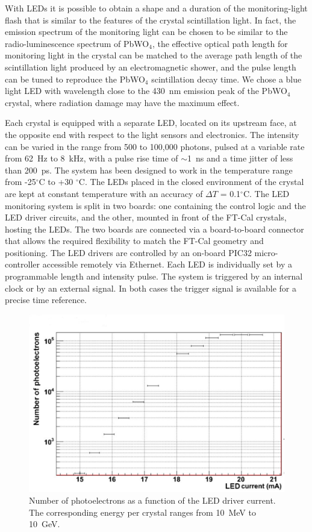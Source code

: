 With LEDs it is possible to obtain a shape and a duration of the monitoring-light flash that is similar to the features
of the crystal scintillation light. In fact, the emission spectrum of the monitoring light can be chosen to be similar to
the radio-luminescence spectrum of PbWO$_4$, the effective optical path length for monitoring light in the crystal
can be matched to the average path length of the scintillation light produced by an electromagnetic shower, and the
pulse length can be tuned to reproduce the PbWO$_4$ scintillation decay time. We chose a blue light LED with
wavelength close to the 430~nm emission peak of the PbWO$_4$ crystal, where radiation damage may have the
maximum effect.

Each crystal is equipped with a separate LED, located on its upstream face, at the opposite end with respect to the
light sensors and electronics. The intensity can be varied in the range from 500 to 100,000 photons, pulsed at a
variable rate from 62~Hz to 8~kHz, with a pulse rise time of $\sim$1~ns and a time jitter of less than 200~ps. The
system has been designed to work in the temperature range from -25$^\circ$C to +30 $^\circ$C. The LEDs placed in
the closed environment of the crystal are kept at constant temperature with an accuracy of $\Delta T$ = 0.1$^\circ$C.
The LED monitoring system is split in two boards: one containing the control logic and the LED driver circuits, and the
other, mounted in front of the FT-Cal crystals, hosting the LEDs. The two boards are connected via a board-to-board
connector that allows the required flexibility to match the FT-Cal geometry and positioning. The LED drivers are
controlled by an on-board PIC32 micro-controller accessible remotely via Ethernet. Each LED is individually set by a
programmable length and intensity pulse. The system is triggered by an internal clock or by an external signal. In
both cases the trigger signal is available for a precise time reference. 

\begin{figure}[th!]
\centering 
\includegraphics[width=1.0\columnwidth]{./fig/dynamics.pdf}
\caption{Number of photoelectrons as a function of the LED driver current. The corresponding energy per crystal
  ranges from 10~MeV to 10~GeV.}
\label{fig:LEDperf1} 
\end{figure}

